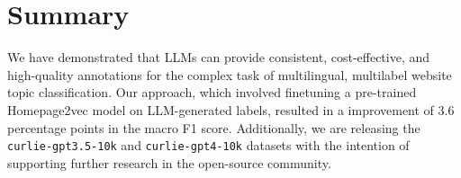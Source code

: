 \section{Summary}\label{sec:summary}

We have demonstrated that LLMs can provide consistent, cost-effective, and high-quality annotations for the complex task of multilingual, multilabel website topic classification. Our approach, which involved finetuning a pre-trained Homepage2vec model on LLM-generated labels, resulted in a improvement of 3.6 percentage points in the macro F1 score. Additionally, we are releasing the \texttt{curlie-gpt3.5-10k} and \texttt{curlie-gpt4-10k} datasets \cite{curlie-gpt-10k} with the intention of supporting further research in the open-source community.